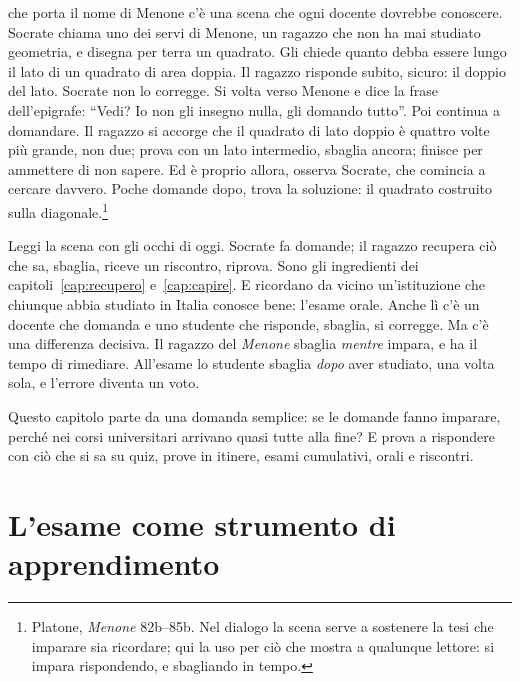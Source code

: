 
 che porta il nome di Menone c'è una scena
che ogni docente dovrebbe conoscere. Socrate chiama uno dei servi di Menone, un
ragazzo che non ha mai studiato geometria, e disegna per terra un
quadrato. Gli chiede quanto debba essere lungo il lato di un quadrato
di area doppia. Il ragazzo risponde subito, sicuro: il doppio del
lato. Socrate non lo corregge. Si volta verso Menone e dice la frase
dell'epigrafe: \enquote{Vedi? Io non gli insegno nulla, gli domando
tutto}. Poi continua a domandare. Il ragazzo si accorge che il
quadrato di lato doppio è quattro volte più grande, non due; prova
con un lato intermedio, sbaglia ancora; finisce per ammettere di non
sapere. Ed è proprio allora, osserva Socrate, che comincia a cercare
davvero. Poche domande dopo, trova la soluzione: il quadrato costruito
sulla diagonale.\footnote{Platone, \emph{Menone} 82b--85b. Nel
dialogo la scena serve a sostenere la tesi che imparare sia
ricordare; qui la uso per ciò che mostra a qualunque lettore: si
impara rispondendo, e sbagliando in tempo.}

Leggi la scena con gli occhi di oggi. Socrate fa domande; il ragazzo
recupera ciò che sa, sbaglia, riceve un riscontro, riprova. Sono gli
ingredienti dei capitoli~\ref{cap:recupero} e~\ref{cap:capire}. E
ricordano da vicino un'istituzione che chiunque abbia studiato in
Italia conosce bene: l'esame orale. Anche lì c'è un docente che domanda e uno studente che
risponde, sbaglia, si corregge. Ma c'è una differenza decisiva. Il
ragazzo del \emph{Menone} sbaglia \emph{mentre} impara, e ha il tempo
di rimediare. All'esame lo studente sbaglia \emph{dopo} aver
studiato, una volta sola, e l'errore diventa un voto.

Questo capitolo parte da una domanda semplice: se le domande fanno
imparare, perché nei corsi universitari arrivano quasi tutte alla fine? E
prova a rispondere con ciò che si sa su quiz, prove in itinere,
esami cumulativi, orali e riscontri.

\section{L'esame come strumento di apprendimento}

